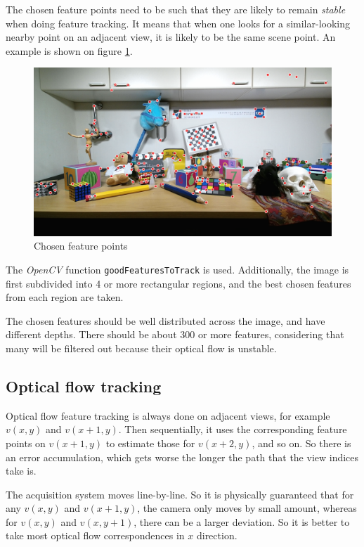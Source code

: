\documentclass{scrreprt}
\begin{document}
The chosen feature points need to be such that they are likely to remain \emph{stable} when doing feature tracking. It means that when one looks for a similar-looking nearby point on an adjacent view, it is likely to be the same scene point. An example is shown on figure \ref{fig:choosefeatures}.

\begin{figure}
\includegraphics[width=\textwidth]{choosefeatures.png}
\caption{Chosen feature points}
\label{fig:choosefeatures}
\end{figure}

The \emph{OpenCV} function \texttt{goodFeaturesToTrack} is used. Additionally, the image is first subdivided into 4 or more rectangular regions, and the best chosen features from each region are taken.

The chosen features should be well distributed across the image, and have different depths. There should be about $300$ or more features, considering that many will be filtered out because their optical flow is unstable.


\subsection{Optical flow tracking}
Optical flow feature tracking is always done on adjacent views, for example $v(x,y)$ and $v(x+1,y)$. Then sequentially, it uses the corresponding feature points on $v(x+1,y)$ to estimate those for $v(x+2,y)$, and so on. So there is an error accumulation, which gets worse the longer the path that the view indices take is.

The acquisition system moves line-by-line. So it is physically guaranteed that for any $v(x,y)$ and $v(x+1,y)$, the camera only moves by small amount, whereas for $v(x,y)$ and $v(x,y+1)$, there can be a larger deviation. So it is better to take most optical flow correspondences in $x$ direction.
\end{document}
